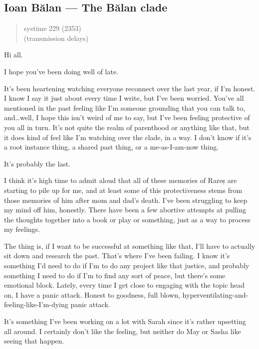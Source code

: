 \hypertarget{ioan-bux103lan-the-bux103lan-clade}{%
\subsection{Ioan Bălan — The Bălan clade}\label{ioan-bux103lan-the-bux103lan-clade}}

\begin{quote}
systime 229 (2353)\\
(transmission delays)
\end{quote}

Hi all.

I hope you've been doing well of late.

It's been heartening watching everyone reconnect over the last year, if I'm honest. I know I say it just about every time I write, but I've been worried. You've all mentioned in the past feeling like I'm someone grounding that you can talk to, and\ldots well, I hope this isn't weird of me to say, but I've been feeling protective of you all in turn. It's not quite the realm of parenthood or anything like that, but it does kind of feel like I'm watching over the clade, in a way. I don't know if it's a root instance thing, a shared past thing, or a me-as-I-am-now thing.

It's probably the last.

I think it's high time to admit aloud that all of these memories of Rareș are starting to pile up for me, and at least some of this protectiveness stems from those memories of him after mom and dad's death. I've been struggling to keep my mind off him, honestly. There have been a few abortive attempts at pulling the thoughts together into a book or play or something, just as a way to process my feelings.

The thing is, if I want to be successful at something like that, I'll have to actually sit down and research the past. That's where I've been failing. I know it's something I'd need to do if I'm to do any project like that justice, and probably something I need to do if I'm to find any sort of peace, but there's some emotional block. Lately, every time I get close to engaging with the topic head on, I have a panic attack. Honest to goodness, full blown, hyperventilating-and-feeling-like-I'm-dying panic attack.

It's something I've been working on a lot with Sarah since it's rather upsetting all around. I certainly don't like the feeling, but neither do May or Sasha like seeing that happen.

